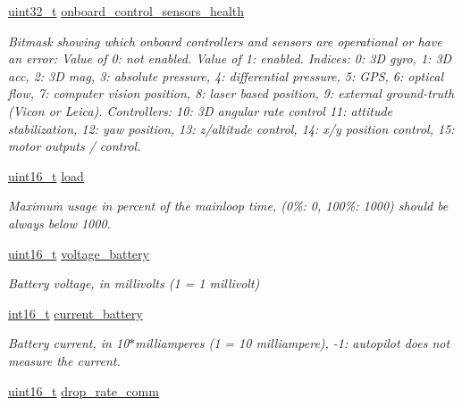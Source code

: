 \begin{DoxyCompactItemize}
\hyperlink{stdint_8h_a435d1572bf3f880d55459d9805097f62}{uint32\-\_\-t} \hyperlink{struct____mavlink__sys__status__t_a8527d9f9e9517ee5a9dc7aba0235ace9}{onboard\-\_\-control\-\_\-sensors\-\_\-health}
\begin{DoxyCompactList}\small\item\em Bitmask showing which onboard controllers and sensors are operational or have an error\-: Value of 0\-: not enabled. Value of 1\-: enabled. Indices\-: 0\-: 3\-D gyro, 1\-: 3\-D acc, 2\-: 3\-D mag, 3\-: absolute pressure, 4\-: differential pressure, 5\-: G\-P\-S, 6\-: optical flow, 7\-: computer vision position, 8\-: laser based position, 9\-: external ground-\/truth (Vicon or Leica). Controllers\-: 10\-: 3\-D angular rate control 11\-: attitude stabilization, 12\-: yaw position, 13\-: z/altitude control, 14\-: x/y position control, 15\-: motor outputs / control. \end{DoxyCompactList}\item 
\hyperlink{stdint_8h_a273cf69d639a59973b6019625df33e30}{uint16\-\_\-t} \hyperlink{struct____mavlink__sys__status__t_a2c25af241ac32995f2194d53dcaaf3e2}{load}
\begin{DoxyCompactList}\small\item\em Maximum usage in percent of the mainloop time, (0\%\-: 0, 100\%\-: 1000) should be always below 1000. \end{DoxyCompactList}\item 
\hyperlink{stdint_8h_a273cf69d639a59973b6019625df33e30}{uint16\-\_\-t} \hyperlink{struct____mavlink__sys__status__t_a47f55c2ec3aeb48c924092e2a46ffc99}{voltage\-\_\-battery}
\begin{DoxyCompactList}\small\item\em Battery voltage, in millivolts (1 = 1 millivolt) \end{DoxyCompactList}\item 
\hyperlink{stdint_8h_aa343fa3b3d06292b959ffdd4c4703b06}{int16\-\_\-t} \hyperlink{struct____mavlink__sys__status__t_a78ab5021909544c255827e8b2bd23034}{current\-\_\-battery}
\begin{DoxyCompactList}\small\item\em Battery current, in 10$\ast$milliamperes (1 = 10 milliampere), -\/1\-: autopilot does not measure the current. \end{DoxyCompactList}\item 
\hyperlink{stdint_8h_a273cf69d639a59973b6019625df33e30}{uint16\-\_\-t} \hyperlink{struct____mavlink__sys__status__t_a08c165a0dcb2a852605e8abaaf9dfd78}{drop\-\_\-rate\-\_\-comm}

\end{DoxyCompactItemize}
